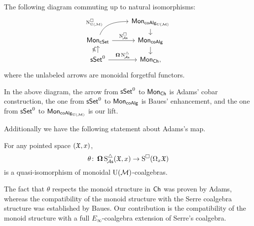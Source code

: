 
\begin{theorem*}
	The following diagram commuting up to natural isomorphisms:
	\[
	\begin{tikzcd} [row sep=small]
		& \Mon_{\coAlg_\UM} \arrow[d] \\
		\Mon_{\cSet} \arrow[ru, "\cchainsUM", out=70, in=180, near start] \arrow[r, "\cchainsA"]
		& \Mon_{\coAlg} \arrow[d] \\
		\sSet^0 \arrow[r, "\cobar \schainsA"] \arrow[u, "\ccobar"]
		& \Mon_{\Ch},
	\end{tikzcd}
	\]
	where the unlabeled arrows are monoidal forgetful functors.
\end{theorem*}

In the above diagram, the arrow from $\mathsf{sSet}^0$ to $\mathsf{Mon}_{\mathsf{Ch}}$ is Adams' cobar construction, the one from $\mathsf{sSet}^0$ to $\mathsf{Mon}_{\mathsf{coAlg}}$ is Baues' enhancement, and the one from $\mathsf{sSet}^0$ to $\mathsf{Mon}_{\mathsf{coAlg}_{{\operatorname{U}(\mathcal{M})}}}$ is our lift.

Additionally we have the following statement about Adams's map.

\begin{theorem*}
	For any pointed space $(\mathfrak{X}, x)$,
	\[
	\theta \colon \operatorname{\mathbf{\Omega}} \operatorname{S^{\triangle}_{\!{\mathcal{A}\mathsf{s}}}}(\mathfrak{X}, x) \to \operatorname{S^{\square}}(\Omega_x \mathfrak{X})
	\]
	is a quasi-isomorphism of monoidal ${\operatorname{U}(\mathcal{M})}$-coalgebras.
\end{theorem*}

The fact that $\theta$ respects the monoid structure in $\mathsf{Ch}$ was proven by Adams, whereas the compatibility of the monoid structure with the Serre coalgebra structure was established by Baues.
Our contribution is the compatibility of the monoid structure with a full $E_\infty$-coalgebra extension of Serre's coalgebra.